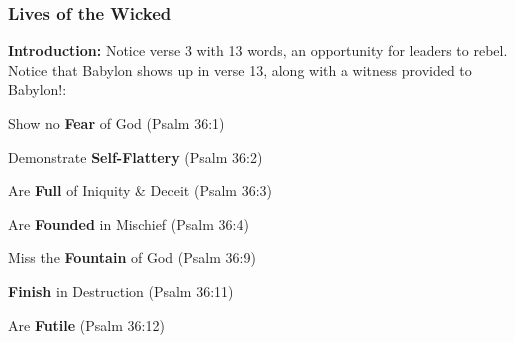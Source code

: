 \subsubsection{Lives of the Wicked}
\textbf{Introduction:} Notice verse 3 with 13 words, an opportunity for leaders to rebel. Notice that Babylon shows up in verse 13, along with a witness provided to Babylon!:\\
\begin{compactenum}[I.][8]
    \item Show no \textbf{Fear} of God  (Psalm 36:1)
    \item Demonstrate \textbf{Self-Flattery}  (Psalm 36:2)
    \item Are \textbf{Full} of Iniquity \& Deceit   (Psalm 36:3)
    \item Are \textbf{Founded} in Mischief  (Psalm 36:4)
    \item Miss the \textbf{Fountain} of God  (Psalm 36:9)
    \item \textbf{Finish} in Destruction  (Psalm 36:11)
    \item Are \textbf{Futile}  (Psalm 36:12)
\end{compactenum}

